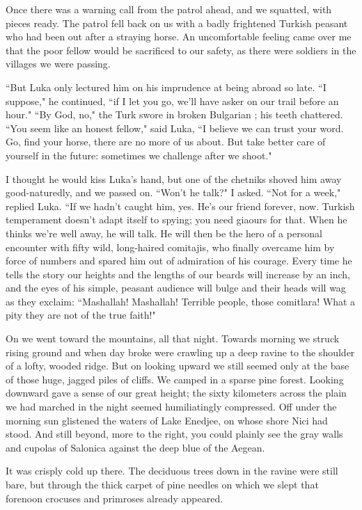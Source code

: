 \documentclass[a5paper,12pt]{book}
\begin{document}
Once there was a warning call from the patrol ahead, and we squatted, with pieces ready. The patrol fell back on us with a badly frightened Turkish peasant who had been out after a straying horse. An uncomfortable feeling came over me that the poor fellow would be sacrificed to our safety, as there were soldiers in the villages we were passing.

“But Luka only lectured him on his imprudence at being abroad so late. “I suppose," he continued, “if I let you go, we'll have asker on our trail before an hour." “By God, no," the Turk swore in broken Bulgarian ; his teeth chattered. “You seem like an honest fellow," said Luka, “I believe we can trust your word. Go, find your horse, there are no more of us about. But take better care of yourself in the future: sometimes we challenge after we shoot."

I thought he would kiss Luka's hand, but one of the chetniks shoved him away good-naturedly, and we passed on. “Won't he talk?" I asked. “Not for a week," replied Luka. “If we hadn’t caught him, yes. He’s our friend forever, now. Turkish temperament doesn’t adapt itself to spying; you need giaours for that. When he thinks we're well away, he will talk. He will then be the hero of a personal encounter with fifty wild, long-haired comitajis, who finally overcame him by force of numbers and spared him out of admiration of his courage. Every time he tells the story our heights and the lengths of our beards will increase by an inch, and the eyes of his simple, peasant audience will bulge and their heads will wag as they exclaim: “Mashallah! Mashallah! Terrible people, those comitlara! What a pity they are not of the true faith!"

On we went toward the mountains, all that night.
Towards morning we struck rising ground and when day broke were crawling up a deep ravine to the shoulder of a lofty, wooded ridge. But on looking upward we still seemed only at the base of those huge, jagged piles of cliffs. We camped in a sparse pine forest. Looking downward gave a sense of our great height; the sixty kilometers across the plain we had marched in the night seemed humiliatingly compressed. Off under the morning sun glistened the waters of Lake Enedjee, on whose shore Nici had stood. And still beyond, more to the right, you could plainly see the gray walls and cupolas of Salonica against the deep blue of the Aegean. 

It was crisply cold up there. The deciduous trees down in the ravine were still bare, but through the thick carpet of pine needles on which we slept that forenoon crocuses and primroses already appeared. 
\end{document}
